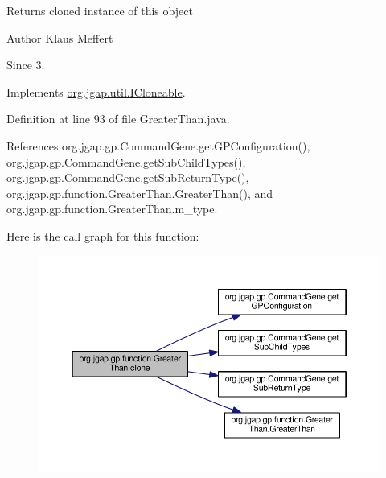 \begin{DoxyReturn}{Returns}
cloned instance of this object
\end{DoxyReturn}
\begin{DoxyAuthor}{Author}
Klaus Meffert 
\end{DoxyAuthor}
\begin{DoxySince}{Since}
3. 
\end{DoxySince}


Implements \hyperlink{interfaceorg_1_1jgap_1_1util_1_1_i_cloneable_aa7e7d62077e6428ad7904932b1b4f7d5}{org.\-jgap.\-util.\-I\-Cloneable}.



Definition at line 93 of file Greater\-Than.\-java.



References org.\-jgap.\-gp.\-Command\-Gene.\-get\-G\-P\-Configuration(), org.\-jgap.\-gp.\-Command\-Gene.\-get\-Sub\-Child\-Types(), org.\-jgap.\-gp.\-Command\-Gene.\-get\-Sub\-Return\-Type(), org.\-jgap.\-gp.\-function.\-Greater\-Than.\-Greater\-Than(), and org.\-jgap.\-gp.\-function.\-Greater\-Than.\-m\-\_\-type.



Here is the call graph for this function\-:
\nopagebreak
\begin{figure}[H]
\begin{center}
\leavevmode
\includegraphics[width=350pt]{classorg_1_1jgap_1_1gp_1_1function_1_1_greater_than_aff23ed8d5593424801ec261b7bb05a62_cgraph}
\end{center}
\end{figure}



